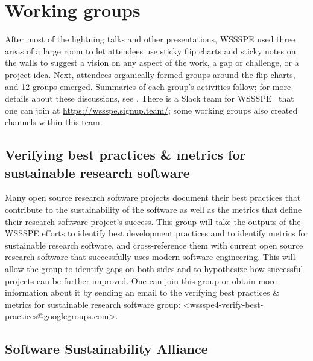 \documentclass[11pt, oneside]{amsart}
\newcommand{\note}[1]{ {\textcolor{blueish}    { ***Note:      #1 }}}
\begin{document}
\section{Working groups} \label{sec:WGs}

After most of the lightning talks and other presentations, WSSSPE used three areas of a large room to let
attendees use sticky flip charts and sticky notes on the walls to suggest a vision on any aspect of the work, a gap or challenge, or a project idea.
Next, attendees organically formed groups around the flip charts, and 12 groups emerged.
Summaries of each group's activities follow; for more details
about these discussions, see \cite{WSSSPE4-report}.
There is a Slack team for WSSSPE~\cite{WSSSPESlack} that one can join at \url{https://wssspe.signup.team/}; some working groups also created channels within this team.


\subsection{Verifying best practices \& metrics for sustainable research software}
\label{sec:best-practices-sustainable}


Many open source research software projects document their best practices that
contribute to the sustainability of the software as well as the metrics that define their research software project's success.
%
This group will take the outputs of the WSSSPE efforts to identify best development practices and to identify metrics for sustainable research software, and cross-reference them with current open source research software that successfully uses modern software engineering.  This will allow the group to identify gaps on both sides and to hypothesize how successful projects can be further improved.  
One can join this group or obtain more information about it by sending an email to the verifying best practices \& metrics for sustainable research software group: <wssspe4-verify-best-practices@googlegroups.com>.


\subsection{Software Sustainability Alliance}
\label{sec:alliance}
\end{document}
